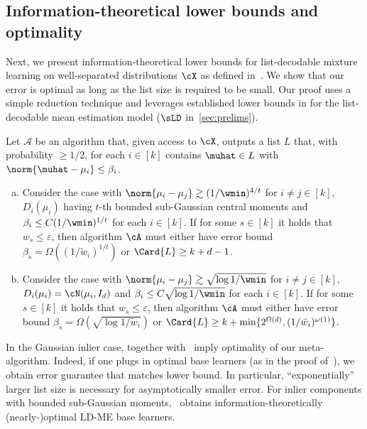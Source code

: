 \subsection{Information-theoretical lower bounds and optimality}

Next, we present information-theoretical lower bounds for list-decodable mixture learning on well-separated distributions $\cX$ as defined in~. 
We show that our error is optimal as long as the list size is required to be small. Our proof uses a simple reduction technique and leverages established lower bounds in \cite{diakonikolas2018list}  for the list-decodable mean estimation model (\(\sLD\) in~\cref{sec:prelims}).


\begin{proposition}
\label{lemma:it_lb_ours}
Let \(\mathcal{A}\) be an algorithm that, 
given access to $\cX$, outputs
a list \(L\) that, with probability \(\geq 1/2\), for each \(i \in [k]\) contains  \(\muhat \in L\) with $\norm{\muhat - \mu_i} \leq \beta_i$.
\begin{enumerate}[(a)]

\item Consider the case with \(\norm{\mu_i - \mu_j} \gtrsim (1 / \wmin)^{4/t}\) for \(i \neq j \in [k]\), \(D_i(\mu_i)\) having \(t\)-th bounded sub-Gaussian central moments and $\beta_i \leq C (1/\wmin)^{1/t}$ for each $i \in [k]$. If for some \(s \in [k]\) it holds that \(w_s \leq \varepsilon\), then 
algorithm $\cA$ must either have error bound $\beta_s = \Omega((1 / \tilde w_i)^{1/t})$
or $\Card{L} \geq k+d - 1$.

    \item Consider the case with \(\norm{\mu_i - \mu_j} \gtrsim \sqrt{\log 1 / \wmin}\) for \(i \neq j \in [k]\), \(D_i(\mu_i) = \cN(\mu_i, I_d)\) and $\beta_i \leq C \sqrt{\log 1/\wmin}$ for each $i \in [k]$.
    If for some \(s \in [k]\) 
it holds that \(w_s \leq \varepsilon\), then
algorithm $\cA$ must either have error bound $\beta_s = \Omega(\sqrt{\log 1 / \tilde w_i})$
or $\Card{L} \geq k+\min\{2^{\Omega(d)}, (1 / \tilde w_i)^{\omega(1)}\}$.
\end{enumerate}

\end{proposition}
In the Gaussian inlier case,
 together with~ imply optimality of our meta-algorithm. Indeed, if one plugs in optimal base learners (as in the proof of~), we obtain error guarantee that matches lower bound. 
In particular, ``exponentially'' larger list size is necessary for asymptotically smaller error. For inlier components with bounded sub-Gaussian moments,~\cite{diakonikolas2018list} obtains information-theoretically (nearly-)optimal LD-ME base learners. 

